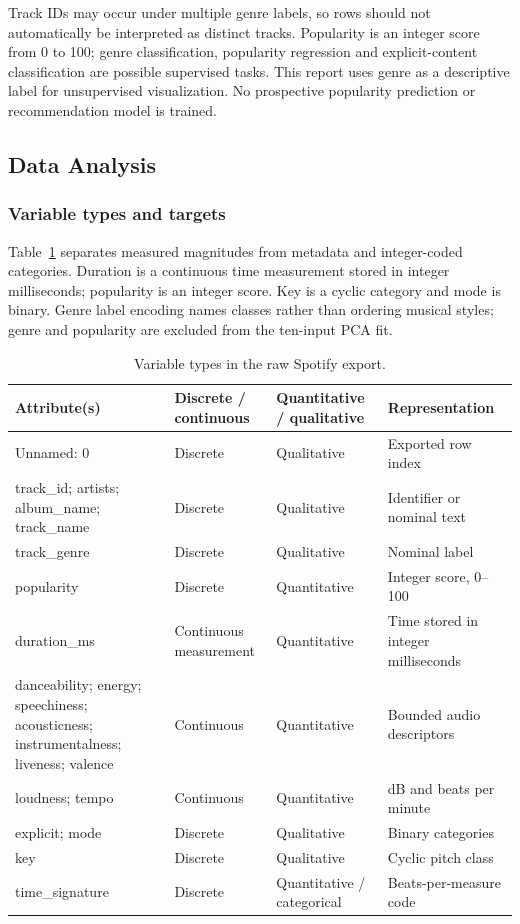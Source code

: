 \documentclass[12pt, a4paper]{article}
\begin{document}
Track IDs may occur under multiple genre labels, so rows should not automatically be interpreted as distinct tracks. Popularity is an integer score from 0 to 100; genre classification, popularity regression and explicit-content classification are possible supervised tasks. This report uses genre as a descriptive label for unsupervised visualization. No prospective popularity prediction or recommendation model is trained.

\subsection{Data Analysis}
\subsubsection{Variable types and targets}
Table~\ref{tab:spotify-types} separates measured magnitudes from metadata and integer-coded categories. Duration is a continuous time measurement stored in integer milliseconds; popularity is an integer score. Key is a cyclic category and mode is binary. Genre label encoding names classes rather than ordering musical styles; genre and popularity are excluded from the ten-input PCA fit.
\begin{table}[htbp]
\centering\small
\setlength{\tabcolsep}{4pt}\renewcommand{\arraystretch}{1.12}
\caption{Variable types in the raw Spotify export.}
\label{tab:spotify-types}
\begin{tabular}{p{.33\linewidth}p{.18\linewidth}p{.20\linewidth}p{.19\linewidth}}
\toprule
\raggedright \textbf{Attribute(s)} & \raggedright \textbf{Discrete / continuous} & \raggedright \textbf{Quantitative / qualitative} & \raggedright \textbf{Representation} \tabularnewline
\midrule
\raggedright Unnamed: 0 & \raggedright Discrete & \raggedright Qualitative & \raggedright Exported row index \tabularnewline
\raggedright track\_id; artists; album\_name; track\_name & \raggedright Discrete & \raggedright Qualitative & \raggedright Identifier or nominal text \tabularnewline
\raggedright track\_genre & \raggedright Discrete & \raggedright Qualitative & \raggedright Nominal label \tabularnewline
\raggedright popularity & \raggedright Discrete & \raggedright Quantitative & \raggedright Integer score, 0--100 \tabularnewline
\raggedright duration\_ms & \raggedright Continuous measurement & \raggedright Quantitative & \raggedright Time stored in integer milliseconds \tabularnewline
\raggedright danceability; energy; speechiness; acousticness; instrumentalness; liveness; valence & \raggedright Continuous & \raggedright Quantitative & \raggedright Bounded audio descriptors \tabularnewline
\raggedright loudness; tempo & \raggedright Continuous & \raggedright Quantitative & \raggedright dB and beats per minute \tabularnewline
\raggedright explicit; mode & \raggedright Discrete & \raggedright Qualitative & \raggedright Binary categories \tabularnewline
\raggedright key & \raggedright Discrete & \raggedright Qualitative & \raggedright Cyclic pitch class \tabularnewline
\raggedright time\_signature & \raggedright Discrete & \raggedright Quantitative / categorical & \raggedright Beats-per-measure code \tabularnewline
\bottomrule
\end{tabular}
\end{table}
\end{document}
